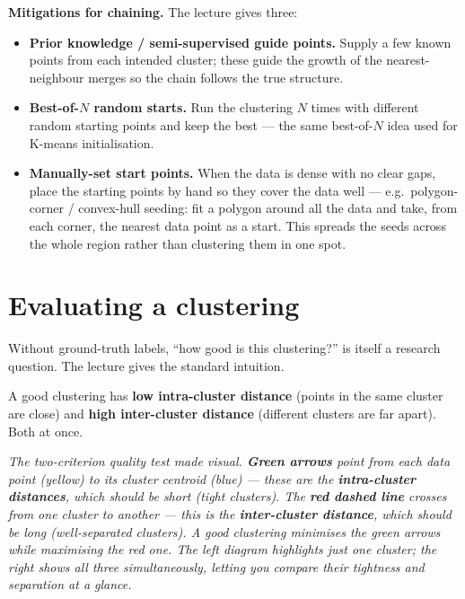 \documentclass[11pt, a4paper]{article}
\begin{document}
\textbf{Mitigations for chaining.} The lecture gives three:
\begin{itemize}
  \item \textbf{Prior knowledge / semi-supervised guide points.} Supply a few known points from each intended cluster; these guide the growth of the nearest-neighbour merges so the chain follows the true structure.
  \item \textbf{Best-of-$N$ random starts.} Run the clustering $N$ times with different random starting points and keep the best — the same best-of-$N$ idea used for K-means initialisation.
  \item \textbf{Manually-set start points.} When the data is dense with no clear gaps, place the starting points by hand so they cover the data well — e.g.\ polygon-corner / convex-hull seeding: fit a polygon around all the data and take, from each corner, the nearest data point as a start. This spreads the seeds across the whole region rather than clustering them in one spot.
\end{itemize}

\section{Evaluating a clustering}

Without ground-truth labels, ``how good is this clustering?'' is itself a research question. The lecture gives the standard intuition.

\begin{defbox}
A good clustering has \textbf{low intra-cluster distance} (points in the same cluster are close) and \textbf{high inter-cluster distance} (different clusters are far apart). Both at once.
\end{defbox}

\begin{center}

\footnotesize\textit{The two-criterion quality test made visual. \textbf{Green arrows} point from each data point (yellow) to its cluster centroid (blue) --- these are the \textbf{intra-cluster distances}, which should be short (tight clusters). The \textbf{red dashed line} crosses from one cluster to another --- this is the \textbf{inter-cluster distance}, which should be long (well-separated clusters). A good clustering minimises the green arrows while maximising the red one. The left diagram highlights just one cluster; the right shows all three simultaneously, letting you compare their tightness and separation at a glance.}
\end{center}
\end{document}
